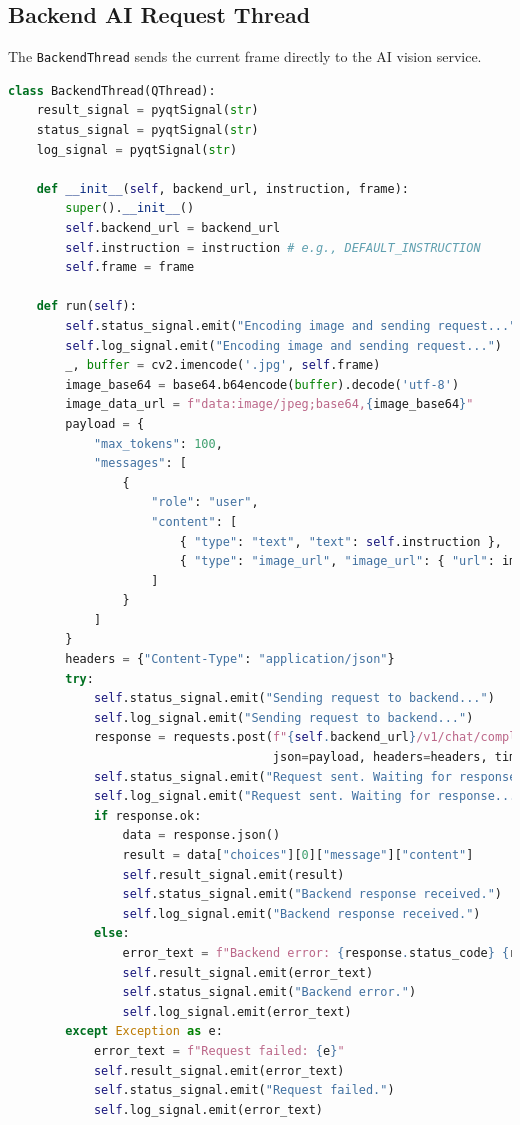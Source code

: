\documentclass[12pt, a4paper]{report}
\begin{document}
\subsection{Backend AI Request Thread}
The \texttt{BackendThread} sends the current frame directly to the AI vision service.
\begin{lstlisting}[language=Python, caption={PyQt6 BackendThread for AI Request Snippet}, label={lst:pyqt_backend_thread_ch4}] % Changed label
class BackendThread(QThread):
    result_signal = pyqtSignal(str)
    status_signal = pyqtSignal(str)
    log_signal = pyqtSignal(str)

    def __init__(self, backend_url, instruction, frame):
        super().__init__()
        self.backend_url = backend_url
        self.instruction = instruction # e.g., DEFAULT_INSTRUCTION
        self.frame = frame

    def run(self):
        self.status_signal.emit("Encoding image and sending request...")
        self.log_signal.emit("Encoding image and sending request...")
        _, buffer = cv2.imencode('.jpg', self.frame)
        image_base64 = base64.b64encode(buffer).decode('utf-8')
        image_data_url = f"data:image/jpeg;base64,{image_base64}"
        payload = {
            "max_tokens": 100,
            "messages": [
                {
                    "role": "user",
                    "content": [
                        { "type": "text", "text": self.instruction },
                        { "type": "image_url", "image_url": { "url": image_data_url } }
                    ]
                }
            ]
        }
        headers = {"Content-Type": "application/json"}
        try:
            self.status_signal.emit("Sending request to backend...")
            self.log_signal.emit("Sending request to backend...")
            response = requests.post(f"{self.backend_url}/v1/chat/completions",
                                     json=payload, headers=headers, timeout=30) # Added timeout
            self.status_signal.emit("Request sent. Waiting for response...")
            self.log_signal.emit("Request sent. Waiting for response...")
            if response.ok:
                data = response.json()
                result = data["choices"][0]["message"]["content"]
                self.result_signal.emit(result)
                self.status_signal.emit("Backend response received.")
                self.log_signal.emit("Backend response received.")
            else:
                error_text = f"Backend error: {response.status_code} {response.text}"
                self.result_signal.emit(error_text)
                self.status_signal.emit("Backend error.")
                self.log_signal.emit(error_text)
        except Exception as e:
            error_text = f"Request failed: {e}"
            self.result_signal.emit(error_text)
            self.status_signal.emit("Request failed.")
            self.log_signal.emit(error_text)
\end{lstlisting}
\end{document}
